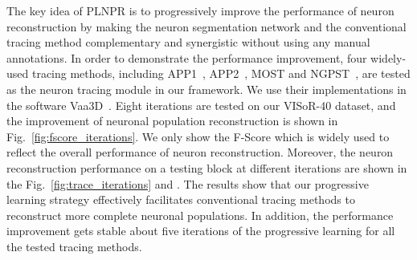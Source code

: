 The key idea of PLNPR is to progressively improve the performance of neuron reconstruction by making the neuron segmentation network and the conventional tracing method complementary and synergistic without using any manual annotations.
In order to demonstrate the performance improvement, four widely-used tracing methods, including APP1~\cite{Peng2011}, APP2~\cite{Xiao2013}, MOST\cite{Wu2014} and NGPST~\cite{Quan2015}, are tested as the neuron tracing module in our framework. 
We use their implementations in the software Vaa3D~\cite{Peng2014}. 
%
Eight iterations are tested on our VISoR-40 dataset, and the improvement of neuronal population reconstruction is shown in Fig.~\ref{fig:fscore_iterations}.
We only show the F-Score which is widely used to reflect the overall performance of neuron reconstruction.
%
Moreover, the neuron reconstruction performance on a testing block at different iterations are shown in the Fig.~\ref{fig:trace_iterations} and .
%
The results show that our progressive learning strategy effectively facilitates conventional tracing methods to reconstruct more complete neuronal populations.
In addition, the performance improvement gets stable about five iterations of the progressive learning for all the tested tracing methods. 


